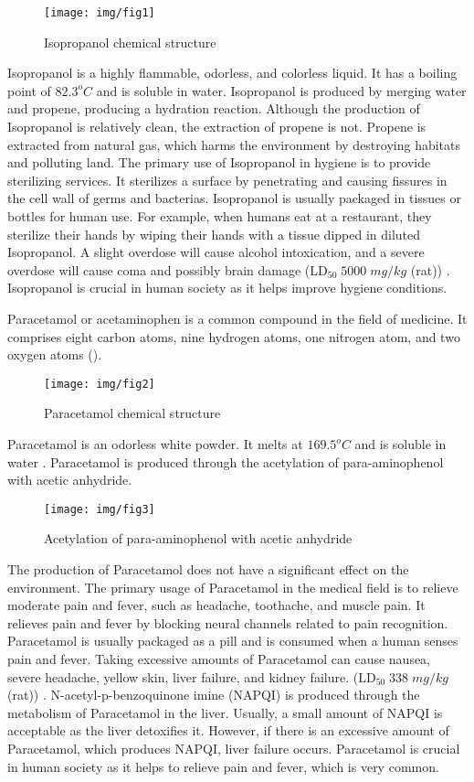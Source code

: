 \documentclass{article}
\begin{document}
\begin{figure}[htbp]
    \center
    \texttt{[image: img/fig1]}
    \caption{Isopropanol chemical structure}
\end{figure}
 
Isopropanol is a highly flammable, odorless, and colorless liquid. It has a boiling point of $82.3^{o}C$ and is soluble in water.  Isopropanol is produced by merging water and propene, producing a hydration reaction. Although the production of Isopropanol is relatively clean, the extraction of propene is not. Propene is extracted from natural gas, which harms the environment by destroying habitats and polluting land. The primary use of Isopropanol in hygiene is to provide sterilizing services. It sterilizes a surface by penetrating and causing fissures in the cell wall of germs and bacterias. Isopropanol is usually packaged in tissues or bottles for human use. For example, when humans eat at a restaurant, they sterilize their hands by wiping their hands with a tissue dipped in diluted Isopropanol. A slight overdose will cause alcohol intoxication, and a severe overdose will cause coma and possibly brain damage ($\text{LD}_{50}\; 5000 \;mg/kg$ (rat)) \cite{cite7}. Isopropanol is crucial in human society as it helps improve hygiene conditions. 
 
Paracetamol or acetaminophen is a common compound in the field of medicine.  It comprises eight carbon atoms, nine hydrogen atoms, one nitrogen atom, and two oxygen atoms (). 
 
\begin{figure}[htbp]
    \center
    \texttt{[image: img/fig2]}
    \caption{Paracetamol chemical structure}
\end{figure}
 
\newpage
Paracetamol is an odorless white powder. It melts at $169.5^{o}C$ and is soluble in water \cite{cite8}. Paracetamol is produced through the acetylation of para-aminophenol with acetic anhydride.
 
\begin{figure}[htbp]
    \center
    \texttt{[image: img/fig3]}
    \caption{Acetylation of para-aminophenol with acetic anhydride}
\end{figure}
 
The production of Paracetamol does not have a significant effect on the environment. The primary usage of Paracetamol in the medical field is to relieve moderate pain and fever, such as headache, toothache, and muscle pain. It relieves pain and fever by blocking neural channels related to pain recognition. Paracetamol is usually packaged as a pill and is consumed when a human senses pain and fever. Taking excessive amounts of Paracetamol can cause nausea, severe headache, yellow skin, liver failure, and kidney failure. ($\text{LD}_{50}\; 338\; mg/kg$ (rat)) \cite{cite9}. N-acetyl-p-benzoquinone imine (NAPQI) is produced through the metabolism of Paracetamol in the liver. Usually, a small amount of NAPQI is acceptable as the liver detoxifies it. However, if there is an excessive amount of Paracetamol, which produces NAPQI, liver failure occurs. Paracetamol is crucial in human society as it helps to relieve pain and fever, which is very common. 
 
\end{document}
